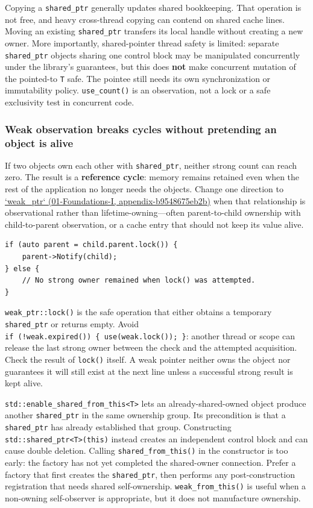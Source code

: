 Copying a \texttt{shared\_ptr} generally updates shared bookkeeping. That operation is not free, and heavy cross-thread copying can contend on shared cache lines. Moving an existing \texttt{shared\_ptr} transfers its local handle without creating a new owner. More importantly, shared-pointer thread safety is limited: separate \texttt{shared\_ptr} objects sharing one control block may be manipulated concurrently under the library's guarantees, but this does \textbf{not} make concurrent mutation of the pointed-to \texttt{T} safe. The pointee still needs its own synchronization or immutability policy. \texttt{use\_count()} is an observation, not a lock or a safe exclusivity test in concurrent code.

\subsubsection{Weak observation breaks cycles without pretending an object is alive}\label{weak-observation-breaks-cycles-without-pretending-an-object-is-alive}

If two objects own each other with \texttt{shared\_ptr}, neither strong count can reach zero. The result is a \textbf{reference cycle}: memory remains retained even when the rest of the application no longer needs the objects. Change one direction to \href{}{`weak\_ptr` (01-Foundations-I, appendix-b9548675eb2b)} when that relationship is observational rather than lifetime-owning---often parent-to-child ownership with child-to-parent observation, or a cache entry that should not keep its value alive.

\begin{verbatim}
if (auto parent = child.parent.lock()) {
    parent->Notify(child);
} else {
    // No strong owner remained when lock() was attempted.
}
\end{verbatim}

\texttt{weak\_ptr::lock()} is the safe operation that either obtains a temporary \texttt{shared\_ptr} or returns empty. Avoid \texttt{if\ (!weak.expired())\ \{\ use(weak.lock());\ \}}: another thread or scope can release the last strong owner between the check and the attempted acquisition. Check the result of \texttt{lock()} itself. A weak pointer neither owns the object nor guarantees it will still exist at the next line unless a successful strong result is kept alive.

\texttt{std::enable\_shared\_from\_this\textless{}T\textgreater{}} lets an already-shared-owned object produce another \texttt{shared\_ptr} in the same ownership group. Its precondition is that a \texttt{shared\_ptr} has already established that group. Constructing \texttt{std::shared\_ptr\textless{}T\textgreater{}(this)} instead creates an independent control block and can cause double deletion. Calling \texttt{shared\_from\_this()} in the constructor is too early: the factory has not yet completed the shared-owner connection. Prefer a factory that first creates the \texttt{shared\_ptr}, then performs any post-construction registration that needs shared self-ownership. \texttt{weak\_from\_this()} is useful when a non-owning self-observer is appropriate, but it does not manufacture ownership.

